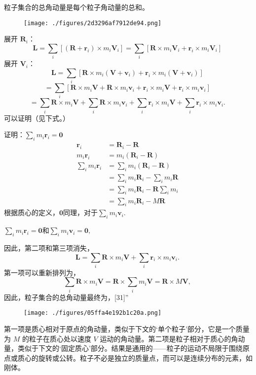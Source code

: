粒子集合的总角动量是每个粒子角动量的总和。
\begin{figure}[ht]
\centering
\texttt{[image: ./figures/2d3296af7912de94.png]}
\caption{} \label{fig_JDL_7}
\end{figure}
展开 \(\mathbf{R}_{i}\)：
\[
\mathbf{L} = \sum_{i} \left[\left(\mathbf{R} + \mathbf{r}_{i}\right) \times m_{i} \mathbf{V}_{i}\right] = \sum_{i} \left[\mathbf{R} \times m_{i} \mathbf{V}_{i} + \mathbf{r}_{i} \times m_{i} \mathbf{V}_{i}\right]~
\]
展开 \(\mathbf{V}_{i}\)：
\[
\mathbf{L} = \sum_{i} \left[\mathbf{R} \times m_{i} \left(\mathbf{V} + \mathbf{v}_{i}\right) + \mathbf{r}_{i} \times m_{i} \left(\mathbf{V} + \mathbf{v}_{i}\right)\right]~
\]
\[
= \sum_{i} \left[\mathbf{R} \times m_{i} \mathbf{V} + \mathbf{R} \times m_{i} \mathbf{v}_{i} + \mathbf{r}_{i} \times m_{i} \mathbf{V} + \mathbf{r}_{i} \times m_{i} \mathbf{v}_{i}\right]~
\]
\[
= \sum_{i} \mathbf{R} \times m_{i} \mathbf{V} + \sum_{i} \mathbf{R} \times m_{i} \mathbf{v}_{i} + \sum_{i} \mathbf{r}_{i} \times m_{i} \mathbf{V} + \sum_{i} \mathbf{r}_{i} \times m_{i} \mathbf{v}_{i}.~
\]
可以证明（见下式。）

证明：\(\sum _{i} m_{i} \mathbf{r}_{i} = \mathbf{0}\)
\begin{equation}
\begin{aligned}
    \mathbf{r}_i &= \mathbf{R}_i - \mathbf{R} \\
    m_i \mathbf{r}_i &= m_i (\mathbf{R}_i - \mathbf{R}) \\
    \sum_i m_i \mathbf{r}_i &= \sum_i m_i (\mathbf{R}_i - \mathbf{R}) \\
    &= \sum_i m_i \mathbf{R}_i - \sum_i m_i \mathbf{R} \\
    &= \sum_i m_i \mathbf{R}_i - \mathbf{R} \sum_i m_i \\
    &= \sum_i m_i \mathbf{R}_i - M \mathbf{R}
\end{aligned}~
\end{equation} 
根据质心的定义，\(\mathbf{0}\)同理，对于\(\sum_{i} m_{i} \mathbf{v}_{i}\).

\(\sum _{i}m_{i}\mathbf {r}_{i}=\mathbf{0}\)和\(\sum _{i}m_{i}\mathbf {v}_{i}=\mathbf{0},\)

因此，第二项和第三项消失，
\[
\mathbf{L} = \sum_{i} \mathbf{R} \times m_{i} \mathbf{V} + \sum_{i} \mathbf{r}_{i} \times m_{i} \mathbf{v}_{i}.~
\]
第一项可以重新排列为，
\[
\sum _{i} \mathbf{R} \times m_{i} \mathbf{V} = \mathbf{R} \times \sum _{i} m_{i} \mathbf{V} = \mathbf{R} \times M \mathbf{V},~
\]
因此，粒子集合的总角动量最终为，[31]”
 \begin{figure}[ht]
 \centering
 \texttt{[image: ./figures/05ffa4e192b1c20a.png]}
 \caption{} \label{fig_JDL_8}
 \end{figure} 
 第一项是质心相对于原点的角动量，类似于下文的‘单个粒子’部分，它是一个质量为 \( M \) 的粒子在质心处以速度 \( V \) 运动的角动量。第二项是粒子相对于质心的角动量，类似于下文的‘固定质心’部分。结果是通用的——粒子的运动不局限于围绕原点或质心的旋转或公转。粒子不必是独立的质量点，而可以是连续分布的元素，如刚体。

